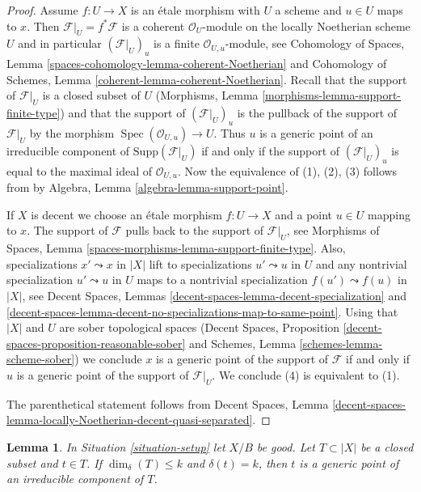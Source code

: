 \documentclass{stacks-project}
\theoremstyle{plain}
\newtheorem{lemma}[subsection]{Lemma}
\theoremstyle{definition}
\theoremstyle{remark}
\numberwithin{equation}{subsection}
\def\Spec{\mathop{\mathrm{Spec}}}
\begin{document}
\begin{proof}
Assume $f : U \to X$ is an \'etale morphism with $U$ a scheme
and $u \in U$ maps to $x$. Then $\mathcal{F}|_U = f^*\mathcal{F}$
is a coherent $\mathcal{O}_U$-module on the locally Noetherian
scheme $U$ and in particular $(\mathcal{F}|_U)_u$ is a finite
$\mathcal{O}_{U, u}$-module, see Cohomology of Spaces, Lemma
\ref{spaces-cohomology-lemma-coherent-Noetherian}
and Cohomology of Schemes, Lemma
\ref{coherent-lemma-coherent-Noetherian}.
Recall that the support of $\mathcal{F}|_U$ is a closed subset of $U$
(Morphisms, Lemma \ref{morphisms-lemma-support-finite-type}) and
that the support of $(\mathcal{F}|_U)_u$ is the pullback
of the support of $\mathcal{F}|_U$ by the morphism
$\Spec(\mathcal{O}_{U, u}) \to U$. Thus $u$ is a generic point
of an irreducible component of $\text{Supp}(\mathcal{F}|_U)$
if and only if the support of $(\mathcal{F}|_U)_u$ is equal
to the maximal ideal of $\mathcal{O}_{U, u}$.
Now the equivalence of (1), (2), (3) follows from
by Algebra, Lemma \ref{algebra-lemma-support-point}.

\medskip\noindent
If $X$ is decent we choose an \'etale morphism $f : U \to X$ and a point
$u \in U$ mapping to $x$. The support of $\mathcal{F}$ pulls back to
the support of $\mathcal{F}|_U$, see
Morphisms of Spaces, Lemma \ref{spaces-morphisms-lemma-support-finite-type}.
Also, specializations $x' \leadsto x$ in $|X|$ lift to specializations
$u' \leadsto u$ in $U$ and any nontrivial specialization $u' \leadsto u$ in $U$
maps to a nontrivial specialization $f(u') \leadsto f(u)$ in $|X|$, see
Decent Spaces, Lemmas
\ref{decent-spaces-lemma-decent-specialization} and
\ref{decent-spaces-lemma-decent-no-specializations-map-to-same-point}.
Using that $|X|$ and $U$ are sober topological spaces
(Decent Spaces, Proposition \ref{decent-spaces-proposition-reasonable-sober}
and
Schemes, Lemma \ref{schemes-lemma-scheme-sober}) we conclude
$x$ is a generic point of the support of $\mathcal{F}$
if and only if $u$ is a generic point of the support of
$\mathcal{F}|_U$. We conclude (4) is equivalent to (1).

\medskip\noindent
The parenthetical statement follows from Decent Spaces, Lemma
\ref{decent-spaces-lemma-locally-Noetherian-decent-quasi-separated}.
\end{proof}

\begin{lemma}
\label{lemma-point-of-max-dimension}
In Situation \ref{situation-setup} let $X/B$ be good.
Let $T \subset |X|$ be a closed subset and $t \in T$.
If $\dim_\delta(T) \leq k$ and $\delta(t) = k$, then
$t$ is a generic point of an irreducible component of $T$.
\end{lemma}
\end{document}
